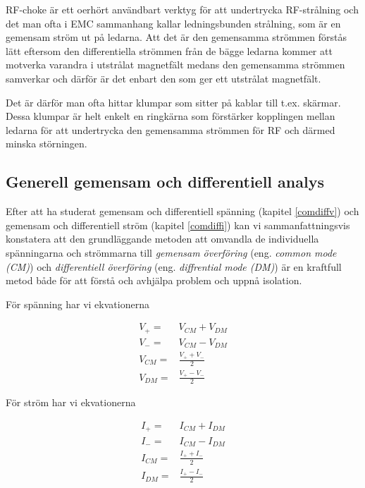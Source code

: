 RF-choke är ett oerhört användbart verktyg för att undertrycka RF-strålning
och det man ofta i EMC sammanhang kallar ledningsbunden strålning, som är en
gemensam ström ut på ledarna. Att det är den gemensamma strömmen förstås lätt
eftersom den differentiella strömmen från de bägge ledarna kommer att motverka
varandra i utstrålat magnetfält medans den gemensamma strömmen samverkar och
därför är det enbart den som ger ett utstrålat magnetfält.

Det är därför man ofta hittar klumpar som sitter
på kablar till t.ex. skärmar. Dessa klumpar är helt enkelt en ringkärna som
förstärker kopplingen mellan ledarna för att undertrycka den gemensamma strömmen
för RF och därmed minska störningen.

\subsection{Generell gemensam och differentiell analys}
\label{comdiffgeneric}

Efter att ha studerat gemensam och differentiell spänning (kapitel \ref{comdiffv})
och gemensam och differentiell ström (kapitel \ref{comdiffi}) kan vi
sammanfattningsvis konstatera att den grundläggande metoden att omvandla
de individuella spänningarna och strömmarna till \emph{gemensam överföring}
(eng. \emph{common mode (CM)}) och \emph{differentiell överföring}
(eng. \emph{diffrential mode (DM)}) är en kraftfull metod både för att
förstå och avhjälpa problem och uppnå isolation.

För spänning har vi ekvationerna

\begin{eqnarray}
V_+ = & V_{CM} + V_{DM}\\
V_- = & V_{CM} - V_{DM}\\
V_{CM} = & \frac{V_+ + V_-}{2}\\
V_{DM} = & \frac{V_+ - V_-}{2}
\end{eqnarray}

För ström har vi ekvationerna

\begin{eqnarray}
I_+ = & I_{CM} + I_{DM}\\
I_- = & I_{CM} - I_{DM}\\
I_{CM} = & \frac{I_+ + I_-}{2}\\
I_{DM} = & \frac{I_+ - I_-}{2}
\end{eqnarray}

